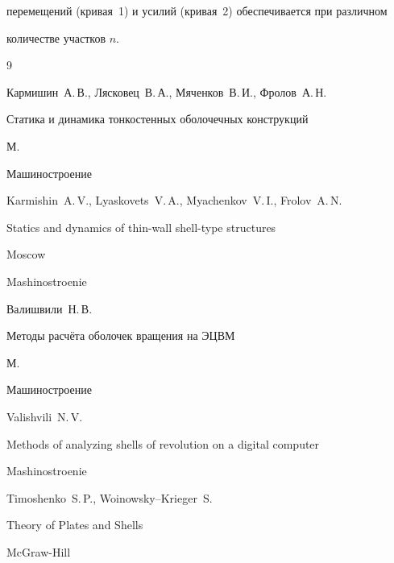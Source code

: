 перемещений (кривая~1) и усилий (кривая~2) обеспечивается при различном

количестве участков $n$.







\begin{thebibliography}{9}




\by Кармишин~А.\,В., Лясковец~В.\,А., Мяченков~В.\,И., Фролов~А.\,Н.

\book Статика и динамика тонкостенных оболочечных конструкций

\publaddr М.

\publ Машиностроение



\misctransl

\by Karmishin~A.\,V., Lyaskovets~V.\,A., Myachenkov~V.\,I., Frolov~A.\,N.

\book  Statics and dynamics of thin-wall shell-type structures

\publaddr Moscow

\publ Mashinostroenie 






\by Валишвили~Н.\,В.

\book Методы расчёта оболочек вращения на ЭЦВМ

\publaddr М.

\publ Машиностроение



\misctransl

\by Valishvili~N.\,V.

\book Methods of analyzing shells of revolution on a digital computer 

\publ Mashinostroenie






\by Timoshenko~S.\,P., Woinowsky--Krieger~S. 

\book Theory of Plates and Shells

\publ McGraw-Hill


\end{thebibliography}
